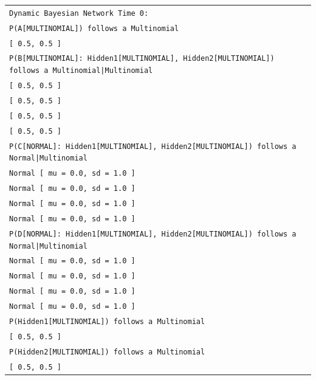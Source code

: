 \vspace{-0.1in}
\begin{table}[H]
\small{\begin{tabular}{l} \\

\texttt{Dynamic Bayesian Network Time 0:}\\
\texttt{P(A[MULTINOMIAL]) follows a Multinomial}\\
\texttt{[ 0.5, 0.5 ]}\\
\texttt{P(B[MULTINOMIAL]: Hidden1[MULTINOMIAL], Hidden2[MULTINOMIAL]) follows a Multinomial|Multinomial}\\
\texttt{[ 0.5, 0.5 ]}\\
\texttt{[ 0.5, 0.5 ]}\\
\texttt{[ 0.5, 0.5 ]}\\
\texttt{[ 0.5, 0.5 ]}\\
\texttt{P(C[NORMAL]: Hidden1[MULTINOMIAL], Hidden2[MULTINOMIAL]) follows a Normal|Multinomial}\\
\texttt{Normal [ mu = 0.0, sd = 1.0 ]}\\
\texttt{Normal [ mu = 0.0, sd = 1.0 ]}\\
\texttt{Normal [ mu = 0.0, sd = 1.0 ]}\\
\texttt{Normal [ mu = 0.0, sd = 1.0 ]}\\

\texttt{P(D[NORMAL]: Hidden1[MULTINOMIAL], Hidden2[MULTINOMIAL]) follows a Normal|Multinomial}\\
\texttt{Normal [ mu = 0.0, sd = 1.0 ]}\\
\texttt{Normal [ mu = 0.0, sd = 1.0 ]}\\
\texttt{Normal [ mu = 0.0, sd = 1.0 ]}\\
\texttt{Normal [ mu = 0.0, sd = 1.0 ]}\\

\texttt{P(Hidden1[MULTINOMIAL]) follows a Multinomial}\\
\texttt{[ 0.5, 0.5 ]}\\

\texttt{P(Hidden2[MULTINOMIAL]) follows a Multinomial}\\
\texttt{[ 0.5, 0.5 ]}\\

\end{tabular}}
\end{table}

